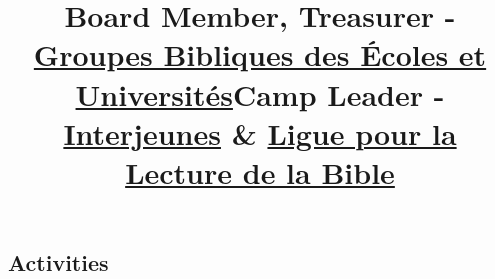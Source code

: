 \documentclass[mm, 11pt]{simple_style}
\begin{document}
\begin{resume}
\sectionline
%
%

\section{Activities}
\begin{extra}
  \title{Board Member, Treasurer \textnormal{-
  \href{https://www.gbeu.ch}{Groupes Bibliques des Écoles et Universités}}}
\end{extra}
\begin{extra}
  \title{Camp Leader \textnormal{-
  \href{https://www.interjeunes.net/explosion-camp}{Interjeunes} \&
  \href{https://ligue.ch}{Ligue pour la Lecture de la Bible}}}
\end{extra}

\sectionline

\end{resume}
\end{document}
